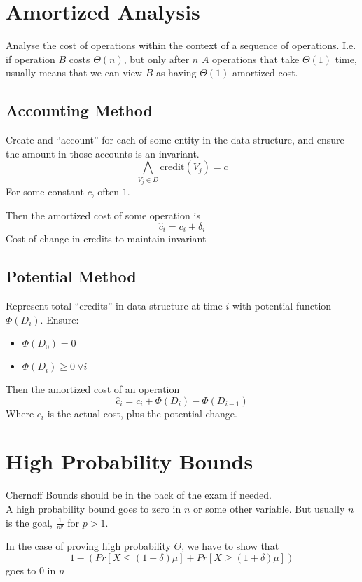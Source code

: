 \documentclass[10pt]{article}
\begin{document}
\section{Amortized Analysis}

Analyse the cost of operations within the context of a sequence of operations.
I.e. if operation $B$ costs $\Theta(n)$, but only after $n$ $A$ operations that take $\Theta(1)$ time,
usually means that we can view $B$ as having $\Theta(1)$ amortized cost.

\subsection{Accounting Method}

Create and ``account'' for each of some entity in the data structure, and ensure the amount in those accounts is an invariant.
$$
\bigwedge\limits_{V_j \in D} \text{credit}(V_j) = c
$$
For some constant $c$, often $1$.

Then the amortized cost of some operation is
$$
\hat{c}_i = c_i + \delta_i
$$
Cost of change in credits to maintain invariant

\subsection{Potential Method}

Represent total ``credits'' in data structure at time $i$ with potential function $\Phi(D_i)$.
Ensure:
\begin{itemize}
  \item $\Phi(D_0) = 0$
  \item $\Phi(D_i) \geq 0 \ \forall i$
\end{itemize}

Then the amortized cost of an operation
$$
\hat{c}_i = c_i + \Phi(D_{i}) - \Phi(D_{i - 1})
$$
Where $c_i$ is the actual cost, plus the potential change.

\section{High Probability Bounds}

Chernoff Bounds should be in the back of the exam if needed. \\

A high probability bound goes to zero in $n$ or some other variable.
But usually $n$ is the goal, $\frac{1}{n^p}$ for $p > 1$.

In the case of proving high probability $\Theta$, we have to show that
$$
1 - \left(Pr[X \leq (1 - \delta) \mu] + Pr[X \geq (1 + \delta)\mu]\right)
$$
goes to $0$ in $n$
\end{document}
